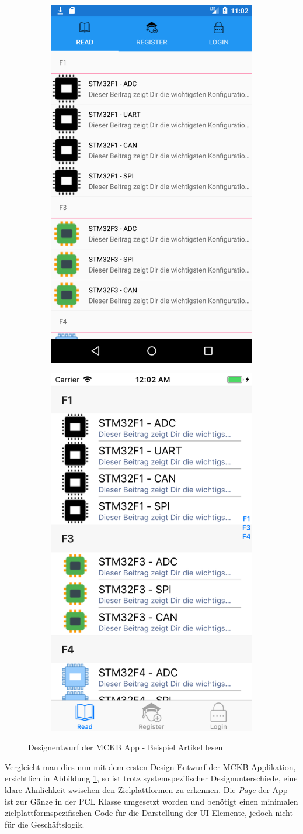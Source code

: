 	\newpage
	\begin{figure}[h!]
		\centering
		\begin{subfigure}
			\centering
			\includegraphics[width=.4\textwidth]{images/MCKB-Droid-reading-edit.png}
		\end{subfigure}
		\begin{subfigure}
			\centering
			\includegraphics[width=.4\textwidth]{images/MCKB-iOS-reading-edit.png}
		\end{subfigure}
		\caption{Designentwurf der MCKB App - Beispiel Artikel lesen}
		\label{fig:mckbApp}
	\end{figure}

	Vergleicht man dies nun mit dem ersten Design Entwurf der MCKB Applikation, ersichtlich in Abbildung \ref{fig:mckbApp}, so ist trotz systemspezifischer Designunterschiede, eine klare Ähnlichkeit zwischen den Zielplattformen zu erkennen. Die \textit{Page} der App ist zur Gänze in der PCL Klasse umgesetzt worden und benötigt einen minimalen zielplattformspezifischen Code für die Darstellung der UI Elemente, jedoch nicht für die Geschäftslogik. 

